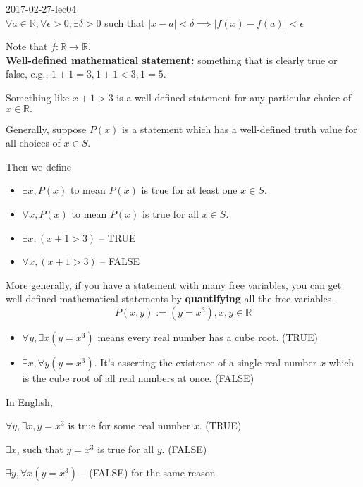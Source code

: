 \documentclass[a4paper, 11pt, twoside]{article}
\begin{document}
2017-02-27-lec04
\\

$\forall a \in \mathbb{R}, \forall \epsilon > 0, \exists \delta > 0$ such that $|x-a| < \delta \implies |f(x) - f(a)| < \epsilon$

Note that $f:\mathbb{R} \rightarrow \mathbb{R}$.
\\

\textbf{Well-defined mathematical statement:} something that is clearly true or false, e.g., $1+1=3, 1+1<3, 1=5.$

Something like $x+1>3$ is a well-defined statement for any particular choice of $x \in \mathbb{R}.$

Generally, suppose $P(x)$ is a statement which has a well-defined truth value for all choices of $x\in S.$

Then we define 

\begin{itemize}
	\item $\exists x, P(x)$ to mean $P(x)$ is true for at least one $x \in S.$
	\item $\forall x, P(x)$ to mean $P(x)$ is true for all $x \in S.$
	\item $\exists x, (x+1 > 3)$ -- TRUE
	\item $\forall x, (x+1 > 3)$ -- FALSE
\end{itemize}

More generally, if you have a statement with many free variables, you can get well-defined mathematical statements by \textbf{quantifying} all the free variables.
\\

\[ P(x,y):= (y = x^3), x, y \in \mathbb{R} \]

\begin{itemize}
	\item $\forall y, \exists x (y=x^3)$ means every real number has a cube root. (TRUE)
	\item $\exists x, \forall y (y=x^3)$. It's asserting the existence of a single real number $x$ which is the cube root of all real numbers at once. (FALSE)
\end{itemize}

In English, 

$\forall y, \exists x, y=x^3$ is true for some real number $x$. (TRUE)

$\exists x$, such that $y=x^3$ is true for all $y$. (FALSE)

$\exists y, \forall x (y=x^3)$ -- (FALSE) for the same reason
\end{document}
